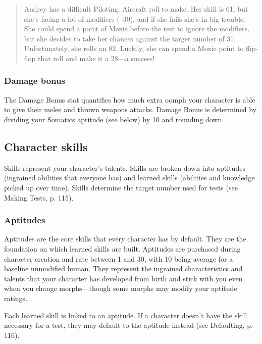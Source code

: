 \begin{quotation} Audrey has a difficult Piloting: Aircraft roll to make. Her skill is 61, but she's facing a lot of modifiers (–30), and if she fails she's in big trouble. She could spend a point of Moxie before the test to ignore the modifiers, but she decides to take her chances against the target number of 31. Unfortunately, she rolls an 82. Luckily, she can spend a Moxie point to flip-flop that roll and make it a 28—a success! \end{quotation} 

\subsubsection{Damage bonus} \label{sec:damage-bonus} 

The Damage Bonus stat quantifies how much extra oomph your character is able to give their melee and thrown weapons attacks. Damage Bonus is determined by dividing your Somatics aptitude (see below) by 10 and rounding down. 

\subsection{Character skills} \label{sec:character-skills} 

Skills represent your character's talents. Skills are broken down into aptitudes (ingrained abilities that everyone has) and learned skills (abilities and knowledge picked up over time). Skills determine the target number used for tests (see Making Tests, p. 115). 

\subsubsection{Aptitudes} \label{sec:aptitudes} 

Aptitudes are the core skills that every character has by default. They are the foundation on which learned skills are built. Aptitudes are purchased during character creation and rate between 1 and 30, with 10 being average for a baseline unmodified human. They represent the ingrained characteristics and talents that your character has developed from birth and stick with you even when you change morphs—though some morphs may modify your aptitude ratings. 

Each learned skill is linked to an aptitude. If a character doesn't have the skill necessary for a test, they may default to the aptitude instead (see Defaulting, p. 116). 

